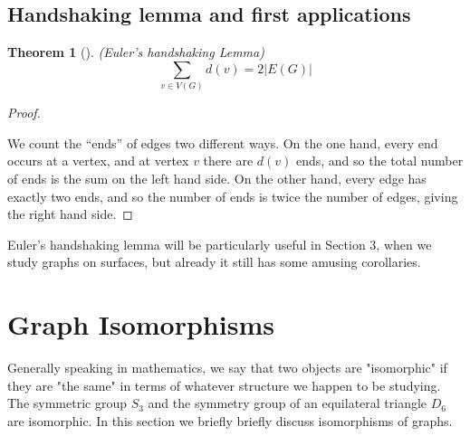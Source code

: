 \documentclass[10pt,]{book}
\theoremstyle{plain}
\newtheorem{theorem}{Theorem}[section]
\theoremstyle{definition}
\theoremstyle{definition}
\theoremstyle{definition}
\theoremstyle{definition}
\numberwithin{equation}{section}
\begin{document}
\subsection[{Handshaking lemma and first applications}]{Handshaking lemma and first applications}\label{subsection-6}
\begin{theorem}[{}]\label{theorem-1}
\hypertarget{p-35}{}%
(Euler's handshaking Lemma)%
%
\begin{equation*}
\sum_{v\in V(G)}d(v)=2|E(G)|
\end{equation*}
\end{theorem}
\begin{proof}\hypertarget{proof-1}{}
\hypertarget{p-36}{}%
We count the ``ends'' of edges two different ways.  On the one hand, every end occurs at a vertex, and at vertex \(v\) there are \(d(v)\) ends, and so the total number of ends is the sum on the left hand side. On the other hand, every edge has exactly two ends, and so the number of ends is twice the number of edges, giving the right hand side.%
\end{proof}
\hypertarget{p-37}{}%
Euler's handshaking lemma will be particularly useful in Section 3, when we study graphs on surfaces, but already it still has some amusing corollaries.%
\typeout{************************************************}
\typeout{************************************************}
\section[{Graph Isomorphisms}]{Graph Isomorphisms}\label{s_intro_isomorphisms}
\hypertarget{p-38}{}%
Generally speaking in mathematics, we say that two objects are "isomorphic" if they are "the same" in terms of whatever structure we happen to be studying.  The symmetric group \(S_3\) and the symmetry group of an equilateral triangle \(D_6\) are isomorphic.  In this section we briefly briefly discuss isomorphisms of graphs.%
\typeout{************************************************}
\typeout{************************************************}
\end{document}
